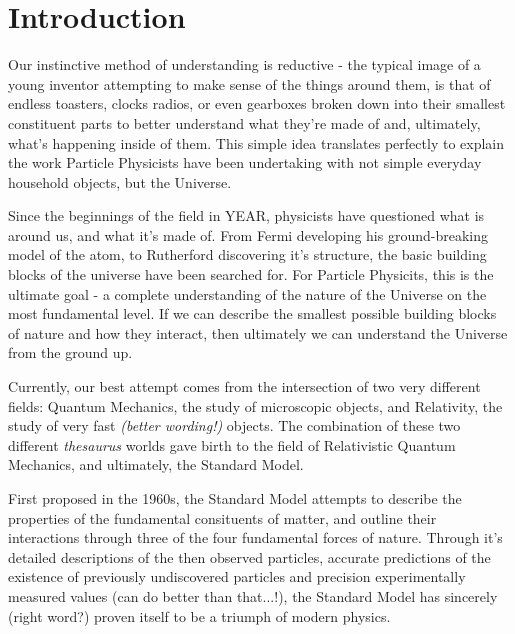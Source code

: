 
\chapter{Introduction}  %

\ifpdf
    \graphicspath{{Chapter1/Figs/Raster/}{Chapter1/Figs/PDF/}{Chapter1/Figs/}}
\else
    \graphicspath{{Chapter1/Figs/Vector/}{Chapter1/Figs/}}
\fi


\label{sec:introduction_intro}

Our instinctive method of understanding is reductive - the typical image of a
young inventor attempting to make sense of the things around them, is
that of endless toasters, clocks radios, or even gearboxes broken down into
their smallest constituent parts to better understand what they're made of and,
ultimately, what's happening inside of them. This simple idea translates
perfectly to explain the work Particle Physicists have been undertaking with
not simple everyday household objects, but the Universe.

Since the beginnings of the field in YEAR, physicists have questioned
what is
around us, and what it's made of. From Fermi developing his ground-breaking
model of the atom, to Rutherford discovering it's structure, the basic building
blocks of the universe have been searched for. For Particle Physicits, this is
the ultimate goal - a complete understanding of the nature of the Universe on
the most
fundamental level. If we can describe the smallest possible building blocks of
nature and how they interact, then ultimately we can understand
the Universe from the ground up.

Currently, our best attempt comes from the intersection of two very different
fields: Quantum Mechanics, the study of microscopic objects, and Relativity, the
study of very fast \emph{(better wording!)} objects. The combination of these
two different \emph{thesaurus} worlds gave birth to the field of Relativistic
Quantum Mechanics, and ultimately, the Standard Model.

First proposed in the 1960s, the Standard Model attempts to describe the
properties of the fundamental consituents of matter, and outline their
interactions through three of the four fundamental forces of nature. Through
it's detailed descriptions of the then observed particles,
accurate predictions of the existence of previously undiscovered particles and
precision experimentally measured values (can do better than that...!), the
Standard Model has sincerely (right word?) proven itself to be a triumph of
modern physics.

